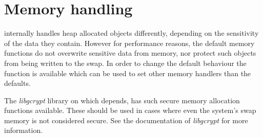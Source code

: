 \section{Memory handling}

\gnutls{} internally handles heap allocated objects differently, depending
on the sensitivity of the data they contain. However for performance
reasons, the default memory functions do not overwrite sensitive data from
memory, nor protect such objects from being written to the swap. 
In order to change the default behaviour the
function is available which can be used to set other memory 
handlers than the defaults. 
\par
The \emph{libgcrypt} library on which \gnutls{} depends, has such secure
memory allocation functions available. These should be used in cases
where even the system's swap memory is not considered secure. See
the documentation of \emph{libgcrypt} for more information.

